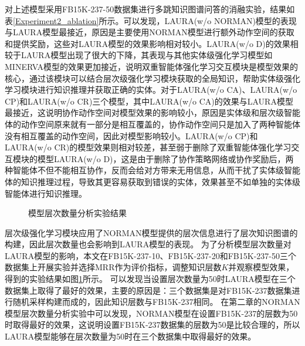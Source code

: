 \documentclass[algorithmlist, AutoFakeBold, AutoFakeSlant, figurelist, tablelist, nomlist, engineering]{seuthesix}
\begin{document}
对上述模型采用FB15K-237-50数据集进行多跳知识图谱问答的消融实验，结果如表\ref{Experiment2_ablation}所示。可以发现，LAURA(w/o NORMAN)模型的表现与LAURA模型最接近，原因是主要使用NORMAN模型进行额外动作空间的获取和提供奖励，这些对LAURA模型的效果影响相对较小。LAURA(w/o D)的效果相较于LAURA模型出现了很大的下降，其表现与其他实体级强化学习模型如MINERVA模型的效果更加接近，说明双重智能体强化学习交互模块是模型效果的核心，通过该模块可以结合层次级强化学习模块获取的全局知识，帮助实体级强化学习模块进行知识推理并获取正确的实体。对于LAURA(w/o CA)、LAURA(w/o CP)和LAURA(w/o CR)三个模型，其中LAURA(w/o CA)的效果与LAURA模型最接近，这说明协作动作空间对模型效果的影响较小，原因是实体级和层次级智能体的动作空间原来就有一部分是相互覆盖的，协作动作空间只是加入了两种智能体没有相互覆盖的动作空间，因此对模型影响较小。LAURA(w/o CP)和LAURA(w/o CR)的模型效果则相对较差，甚至弱于删除了双重智能体强化学习交互模块的模型LAURA(w/o D)，这是由于删除了协作策略网络或协作奖励后，两种智能体不但不能相互协作，反而会给对方带来无用信息，从而干扰了实体级智能体的知识推理过程，导致其更容易获取到错误的实体，效果甚至不如单独的实体级智能体进行知识推理。

\begin{figure}[t]
  \centering
  \caption{模型层次数量分析实验结果}
  \label{Experiment2_layer}
\end{figure}
层次级强化学习模块应用了NORMAN模型提供的层次信息进行了层次知识图谱的构建，因此层次数量也会影响到LAURA模型的表现。
为了分析模型层次数量对LAURA模型的影响，本文在FB15K-237-10、FB15K-237-20和FB15K-237-50三个数据集上开展实验并选择MRR作为评价指标，调整知识层数$K$并观察模型效果，得到的实验结果如图\ref{Experiment2_layer}所示。
可以发现当设置层次数量为50时LAURA模型在三个数据集上取得了最好的效果，主要的原因是：三个数据集是对FB15K-237数据集进行随机采样构建而成的，因此知识层数与FB15K-237相同。
在第二章的NORMAN模型层次数量分析实验中可以发现，NORMAN模型在设置FB15K-237的层数为50时取得最好的效果，这说明设置FB15K-237数据集的层数为50是比较合理的，所以LAURA模型能够在层次数量为50时在三个数据集中取得最好的效果。
\end{document}
